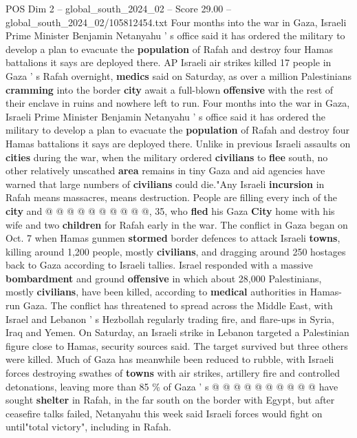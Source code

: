\begin{textsample}{POS Dim 2 – global\_south\_2024\_02 – Score 29.00 – global\_south\_2024\_02/105812454.txt}  \label{ex:f2_pos_032}
Four months into the war in Gaza, Israeli Prime Minister Benjamin Netanyahu ' s office said it has ordered the military to develop a plan to evacuate the \textbf{population} of Rafah and destroy four Hamas battalions it says are deployed there.
AP Israeli air strikes killed 17 people in Gaza ' s Rafah overnight, \textbf{medics} said on Saturday, as over a million Palestinians \textbf{cramming} into the border \textbf{city} await a full-blown \textbf{offensive} with the rest of their enclave in ruins and nowhere left to run.
Four months into the war in Gaza, Israeli Prime Minister Benjamin Netanyahu ' s office said it has ordered the military to develop a plan to evacuate the \textbf{population} of Rafah and destroy four Hamas battalions it says are deployed there.
Unlike in previous Israeli assaults on \textbf{cities} during the war, when the military ordered \textbf{civilians} to \textbf{flee} south, no other relatively unscathed \textbf{area} remains in tiny Gaza and aid agencies have warned that large numbers of \textbf{civilians} could die."Any Israeli \textbf{incursion} in Rafah means massacres, means destruction.
People are filling every inch of the \textbf{city} and @ @ @ @ @ @ @ @ @ @, 35, who \textbf{fled} his Gaza \textbf{City} home with his wife and two \textbf{children} for Rafah early in the war.
The conflict in Gaza began on Oct. 7 when Hamas gunmen \textbf{stormed} border defences to attack Israeli \textbf{towns}, killing around 1,200 people, mostly \textbf{civilians}, and dragging around 250 hostages back to Gaza according to Israeli tallies.
Israel responded with a massive \textbf{bombardment} and ground \textbf{offensive} in which about 28,000 Palestinians, mostly \textbf{civilians}, have been killed, according to \textbf{medical} authorities in Hamas-run Gaza.
The conflict has threatened to spread across the Middle East, with Israel and Lebanon ' s Hezbollah regularly trading fire, and flare-ups in Syria, Iraq and Yemen.
On Saturday, an Israeli strike in Lebanon targeted a Palestinian figure close to Hamas, security sources said.
The target survived but three others were killed.
Much of Gaza has meanwhile been reduced to rubble, with Israeli forces destroying swathes of \textbf{towns} with air strikes, artillery fire and controlled detonations, leaving more than 85 \% of Gaza ' s @ @ @ @ @ @ @ @ @ @ have sought \textbf{shelter} in Rafah, in the far south on the border with Egypt, but after ceasefire talks failed, Netanyahu this week said Israeli forces would fight on until"total victory", including in Rafah.

\end{textsample}
